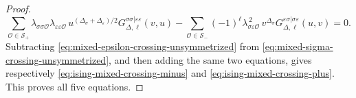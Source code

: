 \begin{proof}
\begin{equation}
  \sum_{\mathcal O\in\mathcal S_+}
  \lambda_{\sigma\sigma\mathcal O}
  \lambda_{\varepsilon\varepsilon\mathcal O}\,
  u^{(\Delta_\sigma+\Delta_\varepsilon)/2}
  G_{\Delta,\ell}^{\sigma\sigma|\varepsilon\varepsilon}(v,u)
  -
  \sum_{\mathcal O\in\mathcal S_-}
  (-1)^\ell\lambda_{\sigma\varepsilon\mathcal O}^{\,2}\,
  v^{\Delta_\sigma}
  G_{\Delta,\ell}^{\varepsilon\sigma|\sigma\varepsilon}(u,v)
  =
  0.
  \label{eq:mixed-epsilon-crossing-unsymmetrized}
\end{equation}
Subtracting
\eqref{eq:mixed-epsilon-crossing-unsymmetrized} from
\eqref{eq:mixed-sigma-crossing-unsymmetrized}, and then adding the same two
equations, gives respectively
\eqref{eq:ising-mixed-crossing-minus} and
\eqref{eq:ising-mixed-crossing-plus}.  This proves all five equations.
\end{proof}

